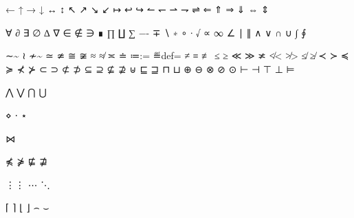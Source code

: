 ←\leftarrow  %
↑\uparrow    %
→\rightarrow %
↓\downarrow  %
↔\leftrightarrow %
↕\updownarrow    %
↖\nwarrow %
↗\nearrow %
↘\searrow %
↙\swarrow %
↦\mapsto %
↩\hookleftarrow  %
↪\hookrightarrow %
↼\leftharpoonup     %
↽\leftharpoondown   %
⇀\rightharpoonup    %
⇁\rightharpoondown  %
⇌\rightleftharpoons %
⇐\Leftarrow      %
⇑\Uparrow        %
⇒\Rightarrow     %
⇓\Downarrow      %
⇔\Leftrightarrow %
⇕\Updownarrow    %

∀\forall   %
∂\partial  %
∃\exists   %
∅\emptyset %
∆\triangle %
∇\nabla    %
∈\in    %
∉\notin %
∋\ni    %
∎\diamond %
∏\prod   %
∐\coprod %
∑\sum    %
−-    %
∓\mp  %
∖\setminus %
∗\ast      %
∘\circ     %
∙\bullet   %
√\surd     %
∝\propto %
∞\infty %
∠\angle %
∣\mid      %
∥\parallel %
∧\wedge %
∨\vee   %
∩\cap   %
∪\cup   %
∫\int  %
∮\oint %

∼\sim %
≀\wr %
≁{\not\sim}   %
≃\simeq %
≄{\not\simeq} %
≅\cong %
≆{\not\cong} %
≈\approx %
≉{\not\approx} %
≍\asymp %
≐\doteq %
≔{:=} %
≝{\buildrel\rm def\over=} %
≠\neq %
≡\equiv %
≢{\not\equiv} %
≤\leq %
≥\geq %
≪\ll %
≫\gg %
≭{\not\asymp} %
≮{\not<}    %
≯{\not>}    %
≰{\not\leq} %
≱{\not\geq} %
≺\prec %
≻\succ %
≼\preceq %
≽\succeq %
⊀{\not\prec} %
⊁{\not\succ} %
⊂\subset %
⊃\supset %
⊄{\not\subset} %
⊅{\not\supset} %
⊆\subseteq %
⊇\supseteq %
⊈{\not\subseteq} %
⊉{\not\supseteq} %
⊎\uplus %
⊑\sqsubseteq %
⊒\sqsupseteq %
⊓\sqcap %
⊔\sqcup %
⊕\oplus  %
⊖\ominus %
⊗\otimes %
⊘\oslash %
⊙\odot   %
⊢\vdash %
⊣\dashv %
⊤\top %
⊥\bot %
⊨\models %

⋀\bigwedge %
⋁\bigvee   %
⋂\bigcap   %
⋃\bigcup   %

⋄\diamond %
⋅\cdot    %
⋆\star    %

⋈\bowtie %

⋠{\not\preceq} %
⋡{\not\succeq} %
⋢{\not\sqsubseteq} %
⋣{\not\sqsupseteq} %

⋮\vdots %
⋯\cdots %
⋱\ddots %

⌈\lceil  %
⌉\rceil  %
⌊\lfloor %
⌋\rfloor %
⌢\frown %
⌣\smile %

